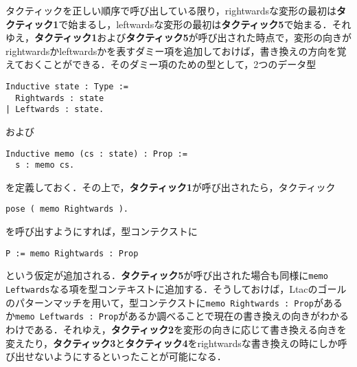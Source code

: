 \documentclass[submit]{ipsj}
\begin{document}
タクティックを正しい順序で呼び出している限り，rightwardsな変形の最初は{\gtfamily\bfseries タクティック1}で始まるし，leftwardsな変形の最初は{\gtfamily\bfseries タクティック5}で始まる．それゆえ，{\gtfamily\bfseries タクティック1}および{\gtfamily\bfseries タクティック5}が呼び出された時点で，変形の向きがrightwardsかleftwardsかを表すダミー項を追加しておけば，書き換えの方向を覚えておくことができる．そのダミー項のための型として，2つのデータ型
\begin{mdframed}[leftmargin=10pt, rightmargin=10pt, skipabove=5pt, skipbelow=5pt]
\begin{verbatim}
Inductive state : Type :=
  Rightwards : state
| Leftwards : state.
\end{verbatim}  
\end{mdframed}
および
\begin{mdframed}[leftmargin=10pt, rightmargin=10pt, skipabove=5pt, skipbelow=5pt]
\begin{verbatim}
Inductive memo (cs : state) : Prop :=
  s : memo cs.
\end{verbatim}
\end{mdframed}
を定義しておく．その上で，{\gtfamily\bfseries タクティック1}が呼び出されたら，タクティック
\begin{mdframed}[leftmargin=10pt, rightmargin=10pt, skipabove=5pt, skipbelow=5pt]
\begin{verbatim}
pose ( memo Rightwards ).
\end{verbatim}
\end{mdframed}
を呼び出すようにすれば，型コンテクストに
\begin{mdframed}[leftmargin=10pt, rightmargin=10pt, skipabove=5pt, skipbelow=5pt]
\begin{verbatim}
P := memo Rightwards : Prop
\end{verbatim}
\end{mdframed}
という仮定が追加される．{\gtfamily\bfseries タクティック5}が呼び出された場合も同様に\verb+memo Leftwards+なる項を型コンテキストに追加する．そうしておけば，Ltacのゴールのパターンマッチを用いて，型コンテクストに\verb+memo Rightwards : Prop+があるか\verb+memo Leftwards : Prop+があるか調べることで現在の書き換えの向きがわかるわけである．それゆえ，{\gtfamily\bfseries タクティック2}を変形の向きに応じて書き換える向きを変えたり，{\gtfamily\bfseries タクティック3}と{\gtfamily\bfseries タクティック4}をrightwardsな書き換えの時にしか呼び出せないようにするといったことが可能になる．
\end{document}
